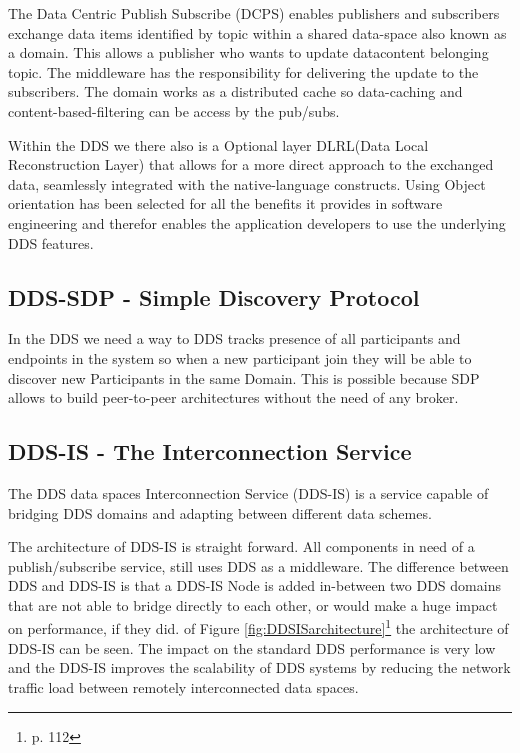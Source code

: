 The Data Centric Publish Subscribe (DCPS) enables publishers and subscribers exchange
data items identified by topic within a shared data-space also known as a domain. This allows a publisher who wants to update datacontent belonging topic. The middleware has the responsibility for delivering the update to the subscribers. The domain works as a distributed cache so data-caching and content-based-filtering can be access by the pub/subs.

Within the DDS we there also is a Optional layer DLRL(Data Local Reconstruction Layer) that allows for a more direct approach to the exchanged data, seamlessly integrated with the native-language
constructs. Using Object orientation has been selected for all the benefits it provides in software engineering and therefor enables the application developers to use the underlying DDS features.

\subsection{DDS-SDP - Simple Discovery Protocol}
In the DDS we need a way to DDS tracks presence of all participants and endpoints in the system so when a new participant join they will be able to discover new Participants in the same Domain. This is possible because SDP allows to build peer-to-peer architectures without the need of any broker. 

\subsection{DDS-IS - The Interconnection Service}
The DDS data spaces Interconnection Service (DDS-IS) is a service capable of bridging DDS domains and adapting between different data schemes.%

The architecture of DDS-IS is straight forward. All components in need of a publish/subscribe service, still uses DDS as a middleware. The difference between DDS and DDS-IS is that a DDS-IS Node is added in-between two DDS domains that are not able to bridge directly to each other, or would make a huge impact on performance, if they did. of Figure \ref{fig:DDSISarchitecture}\footnote{\cite{Lopez-Vega2013} p. 112} the architecture of DDS-IS can be seen. The impact on the standard DDS performance is very low and the DDS-IS improves the scalability of DDS systems by reducing the network traffic load between remotely interconnected data spaces.

